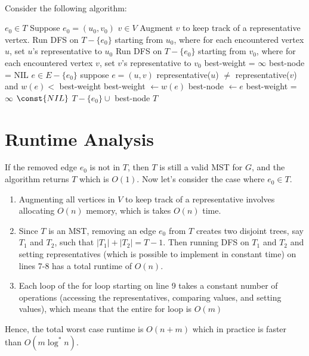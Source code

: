 \documentclass[a4paper,twoside,10pt]{report}
\newcommand{\marginline}{\noindent\makebox[\linewidth][r]{\rule{\textwidth}{1pt}}}
\newcommand{\exer}[1]{\noindent{\Large\textsc{Question #1}} \\ \marginline}
\newenvironment{soln}{\begin{proof}[\textit{\textbf{Solution}}]}{\\ \end{proof}}
\newenvironment{exercise}[1]{\exer{#1}}{}
\begin{document}
\begin{exercise}{1b}
Consider the following algorithm:
\begin{codebox}
\li \If $e_{0} \in T$
    \Then
    \li \Comment Suppose $e_{0} = (u_{0}, v_{0})$
    \li \For $v \in V$
        \Do
        \li Augment $v$ to keep track of a representative vertex.
        \End
    \li Run DFS on $T - \{e_{0}\}$ starting from $u_{0}$, where for each encountered vertex $u$, set $u$'s representative to $u_{0}$
    \li Run DFS on $T - \{e_{0}\}$ starting from $v_{0}$, where for each encountered vertex $v$, set $v$'s representative to $v_{0}$
    \li best-weight = $\infty$
    \li best-node = NIL
    \li \For $e \in E - \{e_{0}\}$ 
        \Do
        \li \Comment suppose $e = (u, v)$
        \li \If representative($u$) $\neq$  representative($v$) and $w(e) <$ best-weight 
            \Then
            \li best-weight $\leftarrow w(e)$
            \li best-node $\leftarrow e$
            \End
        \End
    \li \If best-weight = $\infty$
        \Then
        \li \Return $\const{NIL}$
    \li \Else
        \li \Return $T - \{e_0\} \cup$ best-node
        \End
\li \Else
    \li  \Return $T$
    \End
\end{codebox}

\section{Runtime Analysis}
If the removed edge $e_{0}$ is not in $T$, then $T$ is still a valid MST for $G$, and the algorithm returns $T$ which is $O(1)$. Now let's consider the case where
$e_{0} \in T$.\\
\begin{enumerate}
\item Augmenting all vertices in $V$ to keep track of a
representative involves allocating $O(n)$ memory, which is takes $O(n)$ time.
\item Since $T$ is an MST, removing an edge $e_{0}$ from $T$ creates two disjoint trees, say $T_{1}$ and $T_{2}$, such that $|T_{1}| + |T_{2}| = T - 1$. Then running DFS on $T_{1}$ and $T_{2}$ and setting representatives (which is possible to implement in constant time) on lines 7-8 has a total runtime of $O(n)$.
\item Each loop of the for loop starting on line 9 takes a constant number of operations (accessing the representatives, comparing values, and setting values), which means that the entire for loop is $O(m)$
\end{enumerate}
Hence, the total worst case runtime is $O(n+m)$ which in practice is faster than $O(m\log^{*}n)$.



\end{exercise}
\end{document}
